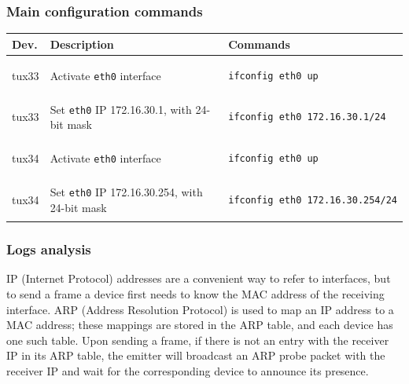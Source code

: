 \documentclass[a4paper, 11pt]{report}
\begin{document}
\subsubsection{Main configuration commands} \label{sec:Com1}

\begin{center}
    \small
    \begin{tabular}{@{}l | m{96mm} | l@{}}
        {\normalfont\textbf{Dev.}} & {\normalfont\textbf{Description}} & {\normalfont\textbf{Commands}}  \\ \hline
        tux33         & Activate \texttt{eth0} interface                     & \begin{lstlisting}[basicstyle=\linespread{0.85}\ttfamily\small, frame=none, numbers=none, language=sh]
ifconfig eth0 up
        \end{lstlisting}               \\
        tux33         & Set \texttt{eth0} IP 172.16.30.1, with 24-bit mask   & \begin{lstlisting}[basicstyle=\linespread{0.85}\ttfamily\small, frame=none, numbers=none, language=sh]
ifconfig eth0 172.16.30.1/24
        \end{lstlisting} \\ \hline
        tux34         & Activate \texttt{eth0} interface                     & \begin{lstlisting}[basicstyle=\linespread{0.85}\ttfamily\small, frame=none, numbers=none, language=sh]
ifconfig eth0 up
        \end{lstlisting}\\
        tux34         & Set \texttt{eth0} IP 172.16.30.254, with 24-bit mask & \begin{lstlisting}[basicstyle=\linespread{0.85}\ttfamily\small, frame=none, numbers=none, language=sh]
ifconfig eth0 172.16.30.254/24
        \end{lstlisting} \\
    \end{tabular}
\end{center}

\subsubsection{Logs analysis} \label{sec:Log1}

IP (Internet Protocol) addresses are a convenient way to refer to interfaces, but to send a frame a device first needs to know the MAC address of the receiving interface.
ARP (Address Resolution Protocol) is used to map an IP address to a MAC address; these mappings are stored in the ARP table, and each device has one such table.
Upon sending a frame, if there is not an entry with the receiver IP in its ARP table, the emitter will broadcast an ARP probe packet with the receiver IP and wait for the corresponding device to announce its presence.
\end{document}
